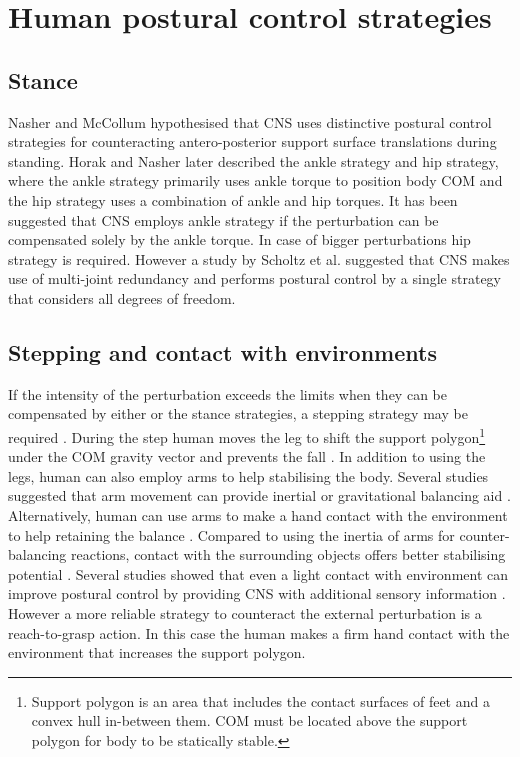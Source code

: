 \documentclass[12pt,a4paper,twoside]{article}
\begin{document}
\section{{Human postural control strategies}}
\subsection{{Stance}}
Nasher and McCollum \cite{Nashner1985} hypothesised that CNS uses distinctive postural control strategies for counteracting antero-posterior support surface translations during standing. Horak and Nasher \cite{Horak1986} later described the ankle strategy and hip strategy, where the ankle strategy primarily uses ankle torque to position body COM and the hip strategy uses a combination of ankle and hip torques. It has been suggested that CNS employs ankle strategy if the perturbation can be compensated solely by the ankle torque. In case of bigger perturbations hip strategy is required. However a study by Scholtz et al. \cite{Scholz2007} suggested that CNS makes use of multi-joint redundancy and performs postural control by a single strategy that considers all degrees of freedom.

\subsection{{Stepping and contact with environments}}
If the intensity of the perturbation exceeds the limits when they can be compensated by either or the stance strategies, a stepping strategy may be required \cite{Lee2014, Horak1986, Mcllroy1995}. During the step human moves the leg to shift the support polygon\footnote{Support polygon is an area that includes the contact surfaces of feet and a convex hull in-between them. COM must be located above the support polygon for body to be statically stable.} under the COM gravity vector and prevents the fall \cite{Maki1997}. In addition to using the legs, human can also employ arms to help stabilising the body. Several studies suggested that arm movement can provide inertial or gravitational balancing aid \cite{Romick-Allen1988,Allum2002}. Alternatively, human can use arms to make a hand contact with the environment to help retaining the balance \cite{Mcllroy1995b,Maki1997,Jeka1997}. Compared to using the inertia of arms for counter-balancing reactions, contact with the surrounding objects offers better stabilising potential \cite{Maki2003}. Several studies showed that even a light contact with environment can improve postural control by providing CNS with additional sensory information \cite{Jeka1997,Riley1997,Clapp1999}. However a more reliable strategy to counteract the external perturbation is a reach-to-grasp action\cite{Mcllroy1995b,Maki1997}. In this case the human makes a firm hand contact with the environment that increases the support polygon.
\end{document}
